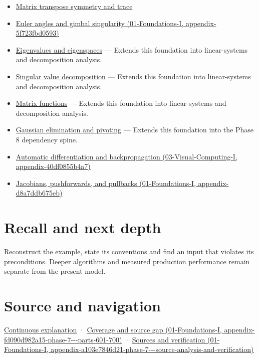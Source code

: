 \begin{itemize}
\item
  \hyperref[appendix-175ca5ff874d]{Matrix transpose symmetry and trace}
\item
  \href{../01-Foundations-I/main.pdf\#nameddest=appendix-5f723fbd0593}{Euler angles and gimbal singularity (01-Foundations-I, appendix-5f723fbd0593)}
\item
  \hyperref[appendix-0b3be18411f9]{Eigenvalues and eigenspaces} --- Extends this foundation into linear-systems and decomposition analysis.
\item
  \hyperref[appendix-1fad5e7f36fa]{Singular value decomposition} --- Extends this foundation into linear-systems and decomposition analysis.
\item
  \hyperref[appendix-0f4bc2bf2b1f]{Matrix functions} --- Extends this foundation into linear-systems and decomposition analysis.
\item
  \hyperref[appendix-f6e77f4a200f]{Gaussian elimination and pivoting} --- Extends this foundation into the Phase 8 dependency spine.
\item
  \href{../03-Visual-Computing-I/main.pdf\#nameddest=appendix-40df0855b4a7}{Automatic differentiation and backpropagation (03-Visual-Computing-I, appendix-40df0855b4a7)}
\item
  \href{../01-Foundations-I/main.pdf\#nameddest=appendix-d8a7ddb675eb}{Jacobians, pushforwards, and pullbacks (01-Foundations-I, appendix-d8a7ddb675eb)}
\end{itemize}

\section{Recall and next depth}\label{appendix-ab31ef447dbf-recall-and-next-depth}

Reconstruct the example, state its conventions and find an input that violates its preconditions. Deeper algorithms and measured production performance remain separate from the present model.

\section{Source and navigation}\label{appendix-ab31ef447dbf-source-and-navigation}

\href{Continuous\%20Notes/Computing\%20Foundations\%20-\%20From\%20Bits\%20to\%20C++\%20and\%20Systems\%20APIs\#Keep\%20the\%20promises\%20visible\%20while\%20moving\%20between\%20representations}{Continuous explanation} · \href{../01-Foundations-I/main.pdf\#nameddest=appendix-fd090d982a15-phase-7---parts-601-700}{Coverage and source gap (01-Foundations-I, appendix-fd090d982a15-phase-7-\/-\/-parts-601-700)} · \href{../01-Foundations-I/main.pdf\#nameddest=appendix-a103e7846d21-phase-7---source-analysis-and-verification}{Sources and verification (01-Foundations-I, appendix-a103e7846d21-phase-7-\/-\/-source-analysis-and-verification)}

